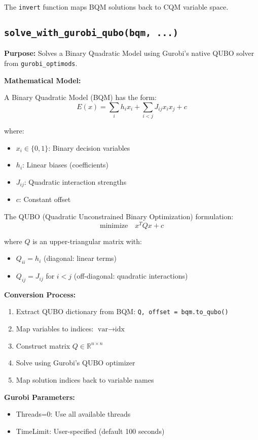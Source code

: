 \documentclass{article}
\begin{document}
The \texttt{invert} function maps BQM solutions back to CQM variable space.

\subsection{\texttt{solve\_with\_gurobi\_qubo(bqm, ...)}}

\textbf{Purpose:} Solves a Binary Quadratic Model using Gurobi's native QUBO solver from \texttt{gurobi\_optimods}.

\textbf{Mathematical Model:}

A Binary Quadratic Model (BQM) has the form:
$$E(x) = \sum_i h_i x_i + \sum_{i<j} J_{ij} x_i x_j + c$$

where:
\begin{itemize}
    \item $x_i \in \{0, 1\}$: Binary decision variables
    \item $h_i$: Linear biases (coefficients)
    \item $J_{ij}$: Quadratic interaction strengths
    \item $c$: Constant offset
\end{itemize}

The QUBO (Quadratic Unconstrained Binary Optimization) formulation:
$$\text{minimize} \quad x^T Q x + c$$

where $Q$ is an upper-triangular matrix with:
\begin{itemize}
    \item $Q_{ii} = h_i$ (diagonal: linear terms)
    \item $Q_{ij} = J_{ij}$ for $i < j$ (off-diagonal: quadratic interactions)
\end{itemize}

\textbf{Conversion Process:}
\begin{enumerate}
    \item Extract QUBO dictionary from BQM: \texttt{Q, offset = bqm.to\_qubo()}
    \item Map variables to indices: $\text{var} \rightarrow \text{idx}$
    \item Construct matrix $Q \in \mathbb{R}^{n \times n}$
    \item Solve using Gurobi's QUBO optimizer
    \item Map solution indices back to variable names
\end{enumerate}

\textbf{Gurobi Parameters:}
\begin{itemize}
    \item Threads=0: Use all available threads
    \item TimeLimit: User-specified (default 100 seconds)
\end{itemize}
\end{document}
